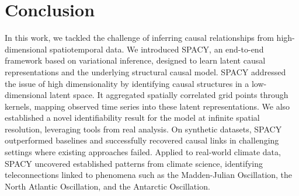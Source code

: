 \vspace{-2mm}
\section{Conclusion}

In this work, we tackled the challenge of inferring causal relationships from high-dimensional spatiotemporal data. We introduced SPACY, an end-to-end framework based on variational inference, designed to learn latent causal representations and the underlying structural causal model. SPACY addressed the issue of high dimensionality by identifying causal structures in a low-dimensional latent space. It aggregated spatially correlated grid points through kernels, mapping observed time series into these latent representations. We also established a novel identifiability result for the model at infinite spatial resolution, leveraging tools from real analysis. On synthetic datasets, SPACY outperformed baselines and successfully recovered causal links in challenging settings where existing approaches failed. Applied to real-world climate data, SPACY uncovered established patterns from climate science, identifying teleconnections linked to phenomena such as the Madden-Julian Oscillation, the North Atlantic Oscillation, and the Antarctic Oscillation.


